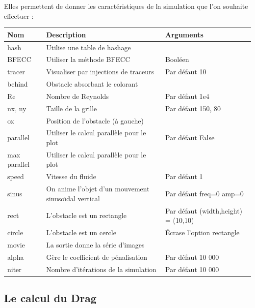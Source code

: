 		Elles permettent de donner les caractéristiques de la simulation que l'on souhaite effectuer :\\
			\begin{table}

			\begin{tabular}{|l | p{7cm}| l |}
				\hline
				\textbf{Nom} & \textbf{Description} & \textbf{Arguments}\\
                \hline
				\hline
				\-\-hash & Utilise une table de hashage & \\
				\hline
				\-\-BFECC & Utiliser la méthode BFECC & Booléen\\
				\hline
				\-\-tracer & Visualiser par injections de traceurs & Par défaut 10\\
				\hline
				\-\-behind & Obstacle absorbant le colorant & \\
				\hline
				\-\-Re & Nombre de Reynolds &  Par défaut 1e4\\
				\hline
				\-\-nx, \-\-ny & Taille de la grille &  Par défaut 150, 80\\
				\hline
				\-\-ox & Position de l'obstacle (à gauche) &\\
				\hline
				\-\-parallel & Utiliser le calcul parallèle pour le plot& Par défaut False\\
				\hline
				\-\-max parallel & Utiliser le calcul parallèle pour le plot & \\
				\hline
				\-\-speed & Vitesse du fluide & Par défaut 1 \\
				\hline
				\-\-sinus & On anime l'objet d'un mouvement sinusoïdal vertical & Par défaut freq=0 amp=0\\
				\hline
				\-\-rect & L'obstacle est un rectangle & Par défaut (width,height) = (10,10)\\
				\hline
				\-\-circle & L'obstacle est un cercle & Écrase l'option rectangle\\
				\hline
				\-\-movie & La sortie donne la série d'images  & \\
				\hline
				\-\-alpha & Gère le coefficient de pénalisation & Par défaut 10 000\\
				\hline
				\-\-niter & Nombre d'itérations de la simulation & Par défaut 10 000\\
				\hline
			\end{tabular}
						
			\end{table}
			
	\subsection{Le calcul du Drag}
	
